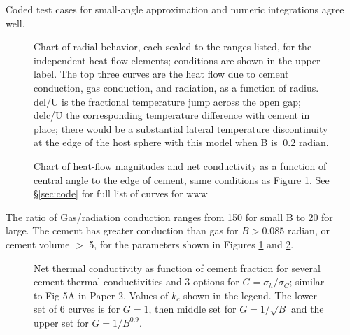 \documentclass{article}
\begin{document}
Coded test cases for small-angle approximation and numeric integrations agree
well.

\begin{figure}[!h] 
\caption{Chart of radial behavior, each scaled to the ranges listed, for the
independent heat-flow elements; conditions are shown in the upper label. The top
three curves are the heat flow due to cement conduction, gas conduction, and
radiation, as a function of radius. del/U is the fractional temperature jump
across the open gap; delc/U the corresponding temperature difference with
cement in place; there would be a substantial lateral temperature discontinuity
at the edge of the host sphere with this model when B is $~0.2$ radian.} 
\label{fig:431} \end{figure}

\begin{figure}[!h] 
\caption{Chart of heat-flow magnitudes and net conductivity as a function of
central angle to the edge of cement, same conditions as Figure \ref{fig:431}.
See \S \ref{sec:code} for full list of curves for www}
\label{fig:432}\end{figure}

The ratio of Gas/radiation conduction ranges from 150 for small B to 20 for
large.  The cement has greater conduction than gas for $B>0.085$ radian, or
cement volume $>$ 5, for the parameters shown in Figures \ref{fig:431} and
\ref{fig:432}.

\begin{figure}[!h] 
\caption{Net thermal conductivity as function of cement fraction for several
cement thermal conductivities and 3 options for $G=\sigma_h / \sigma_C$; similar
to Fig 5A in Paper 2.  Values of $k_c$ shown in the legend. The lower set of 6
curves is for $G=1$, then middle set for $G=1/\sqrt{B}$ and the upper set for
$G=1/B^{0.9}$. }
\label{fig:5A} \end{figure}
\end{document}
